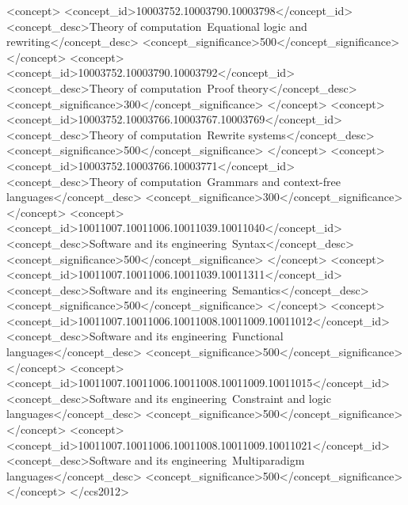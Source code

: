 \documentclass[acmsmall]{acmart}
\newcommand{\Varid}[1]{\mathit{#1}}
\def\resethooks{%
  \global\let\SaveRestoreHook\empty
  \global\let\ColumnHook\empty}
\let\hspre\empty
\let\hspost\empty
\begin{document}
\begin{CCSXML}\begin{hscode}\SaveRestoreHook
\column{B}{@{}>{\hspre}l<{\hspost}@{}}%
\column{E}{@{}>{\hspre}l<{\hspost}@{}}%
\>[B]{}\Varid{ccs2012}\mathbin{>}{}\<[E]%
\ColumnHook
\end{hscode}\resethooks
   <concept>
       <concept_id>10003752.10003790.10003798</concept_id>
       <concept_desc>Theory of computation~Equational logic and rewriting</concept_desc>
       <concept_significance>500</concept_significance>
       </concept>
   <concept>
       <concept_id>10003752.10003790.10003792</concept_id>
       <concept_desc>Theory of computation~Proof theory</concept_desc>
       <concept_significance>300</concept_significance>
       </concept>
   <concept>
       <concept_id>10003752.10003766.10003767.10003769</concept_id>
       <concept_desc>Theory of computation~Rewrite systems</concept_desc>
       <concept_significance>500</concept_significance>
       </concept>
   <concept>
       <concept_id>10003752.10003766.10003771</concept_id>
       <concept_desc>Theory of computation~Grammars and context-free languages</concept_desc>
       <concept_significance>300</concept_significance>
       </concept>
   <concept>
       <concept_id>10011007.10011006.10011039.10011040</concept_id>
       <concept_desc>Software and its engineering~Syntax</concept_desc>
       <concept_significance>500</concept_significance>
       </concept>
   <concept>
       <concept_id>10011007.10011006.10011039.10011311</concept_id>
       <concept_desc>Software and its engineering~Semantics</concept_desc>
       <concept_significance>500</concept_significance>
       </concept>
   <concept>
       <concept_id>10011007.10011006.10011008.10011009.10011012</concept_id>
       <concept_desc>Software and its engineering~Functional languages</concept_desc>
       <concept_significance>500</concept_significance>
       </concept>
   <concept>
       <concept_id>10011007.10011006.10011008.10011009.10011015</concept_id>
       <concept_desc>Software and its engineering~Constraint and logic languages</concept_desc>
       <concept_significance>500</concept_significance>
       </concept>
   <concept>
       <concept_id>10011007.10011006.10011008.10011009.10011021</concept_id>
       <concept_desc>Software and its engineering~Multiparadigm languages</concept_desc>
       <concept_significance>500</concept_significance>
       </concept>
 </ccs2012>
\end{CCSXML}
\end{document}
